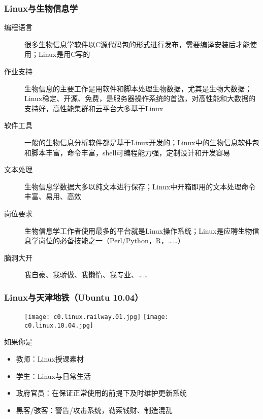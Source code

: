 \begin{frame}
\end{frame}

\begin{frame}
  \frametitle{Linux与生物信息学}
  \begin{description}
    \item[编程语言] 很多生物信息学软件以C源代码包的形式进行发布，需要编译安装后才能使用；Linux是用C写的
    \item[作业支持] 生物信息的主要工作是用软件和脚本处理生物数据，尤其是生物大数据；Linux稳定、开源、免费，是服务器操作系统的首选，对高性能和大数据的支持好，高性能集群和云平台大多基于Linux
    \item[软件工具] 一般的生物信息分析软件都是基于Linux开发的；Linux中的生物信息软件包和脚本丰富，命令丰富，shell可编程能力强，定制设计和开发容易
    \item[文本处理] 生物信息学数据大多以纯文本进行保存；Linux中开箱即用的文本处理命令丰富、易用、高效
    \item[岗位要求] 生物信息学工作者使用最多的平台就是Linux操作系统；Linux是应聘生物信息学岗位的必备技能之一（Perl/Python，R，……）
    \item[脑洞大开] 我自豪、我骄傲、我懒惰、我专业、……
  \end{description}
\end{frame}

\begin{frame}
  \frametitle{Linux与天津地铁（Ubuntu 10.04）}
  \begin{figure}
    \centering
    \texttt{[image: c0.linux.railway.01.jpg]}\quad
    \texttt{[image: c0.linux.10.04.jpg]}
  \end{figure}
  \pause
  \begin{block}{如果你是}
    \begin{itemize}
      \item 教师：Linux授课素材
      \item 学生：Linux与日常生活
      \item 政府官员：在保证正常使用的前提下及时维护更新系统
      \item 黑客/骇客：警告/攻击系统，勒索钱财、制造混乱
    \end{itemize}
  \end{block}
\end{frame}

